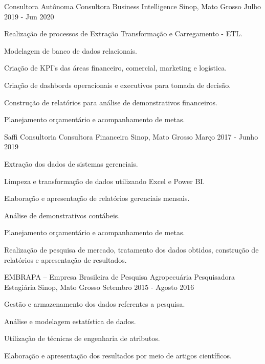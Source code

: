 \documentclass[11pt, letter]{awesome-cv}
\begin{document}
\vspace{-5mm}
\vspace{-3mm}
\begin{cventries}
	\cventry
	{Consultora Autônoma}
	{Consultora Business Intelligence\vspace{-2mm}}
	{Sinop, Mato Grosso\vspace{-2mm}}
	{Julho 2019 - Jun 2020}
	{
		\begin{cvitems}
			\item {Realização de processos de Extração Transformação e Carregamento - ETL.}
			\item {Modelagem de banco de dados relacionais.}
			\item{Criação de KPI's das áreas financeiro, comercial, marketing e logística.}
			\item{Criação de dashbords operacionais e executivos para tomada de decisão.}
			\item {Construção de relatórios para análise de demonstrativos financeiros.}
			\item {Planejamento orçamentário e acompanhamento de metas.
\vspace{-2mm}}
		\end{cvitems}
	}
	\cventry
	{Saffi Consultoria}
	{Consultora Financeira\vspace{-2mm}}
	{Sinop, Mato Grosso\vspace{-2mm}}
	{Março 2017 - Junho 2019}
	{
		\begin{cvitems}
			\item {Extração dos dados de sistemas gerenciais.}
			\item {Limpeza e transformação de dados utilizando Excel e Power BI.}
			\item {Elaboração e apresentação de relatórios gerenciais mensais.}
			\item{Análise de demonstrativos contábeis.}
			\item{Planejamento orçamentário e acompanhamento de metas.}
			\item {Realização de pesquisa de mercado, tratamento dos dados obtidos, construção de relatórios e apresentação de resultados.\vspace{-2mm}}
		\end{cvitems}
	}
	\cventry
	{EMBRAPA – Empresa Brasileira de Pesquisa Agropecuária}
	{Pesquisadora Estagiária\vspace{-2mm}}
	{Sinop, Mato Grosso\vspace{-2mm}}
	{Setembro 2015 - Agosto 2016}
	{
		\begin{cvitems}
			\item {Gestão e armazenamento dos dados referentes a pesquisa.}
			\item {Análise e modelagem estatística de dados.}
			\item {Utilização de técnicas de engenharia de atributos.}
			\item {Elaboração e apresentação dos resultados por meio de artigos científicos.\vspace{-2mm}}
		\end{cvitems}
	}
\end{cventries}
\end{document}
